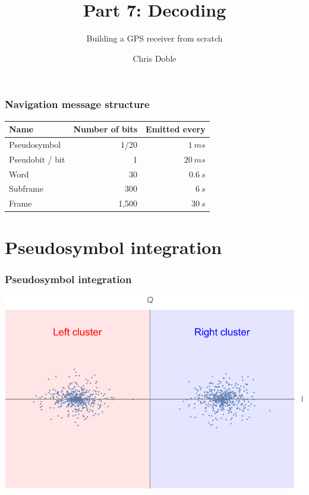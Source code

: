 \documentclass[aspectratio=169, xcolor=table]{beamer}
\author{Chris Doble}
\date{}
\subtitle{Building a GPS receiver from scratch}
\title{Part 7: Decoding}
\begin{document}
\frame{\titlepage}

\begin{frame}
    \frametitle{Navigation message structure}

    \centering
    \begin{tabular}{ l|r|r }
        \textbf{Name} & \textbf{Number of bits} & \textbf{Emitted every} \\
        \hline
        Pseudosymbol & 1/20 & $\qty{1}{ms}$  \\
        Pseudobit / bit & 1 & $\qty{20}{ms}$  \\
        Word & 30 & $\qty{0.6}{s}$  \\
        Subframe & 300 & $\qty{6}{s}$  \\
        Frame & 1,500 & $\qty{30}{s}$
    \end{tabular}
\end{frame}

\section{Pseudosymbol integration}

\begin{frame}
    \frametitle{Pseudosymbol integration}

    \centering
    \includegraphics[width=\textwidth / 2]{1 correlations with regions.pdf}

    \Large
\end{frame}
\end{document}
